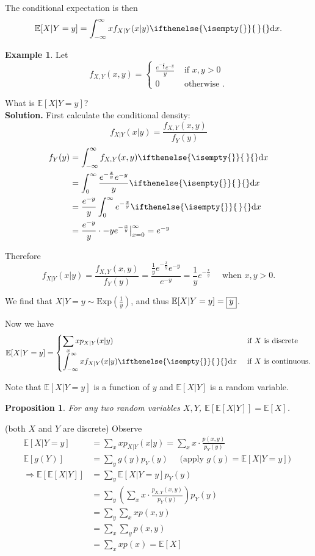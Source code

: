 \documentclass[a4paper,11pt]{amsbook}
\makeatletter
\renewenvironment{proof}[1][\proofname]{\par
    \pushQED{\qed}%
    \normalfont \topsep6\p@\@plus6\p@\relax
    \trivlist
    \itemindent\z@ %
    \item[\hskip\labelsep
          \scshape
      #1\@addpunct{.}]\ignorespaces
}{%
    \popQED\endtrivlist\@endpefalse
}
\newtheorem{proposition}{\hspace{-2em} \color{darkblue} Proposition}[chapter]
\theoremstyle{definition}
\newtheorem{example}{\hspace{-2em} \color{darkblue} Example}[chapter]
\theoremstyle{remark}
\newcommand{\E}{\mathbb{E}}
\newcommand\0{\varnothing}
\newcommand\dx[1][]{\ifthenelse{\isempty{#1}}{\,}{}\mathrm{d}x}
\newcommand\Exp{\text{Exp}}
\makeatother
\begin{document}
The conditional expectation is then $$\E[X|Y=y]=\int_{-\infty}^{\infty}xf_{X|Y}(x|y)\dx.$$

\begin{example}
    Let $$f_{X,Y}(x,y)=\begin{cases}
        \frac{e^{-\frac{x}{y}}e^{-y}}{y} & \text{ if }x,y>0 \\
        0 & \text{ otherwise }.
    \end{cases}$$

    What is $\E[X|Y=y]$?\\
    \textbf{Solution.} First calculate the conditional density:
    $$f_{X|Y}(x|y)=\frac{f_{X,Y}(x,y)}{f_Y(y)}$$
    \begin{align*}
        f_Y(y)&=\int_{-\infty}^\infty f_{X,Y}(x,y)\dx \\
        &=\int_0^\infty\frac{e^{-\frac{x}{y}}e^{-y}}{y}\dx \\
        &=\frac{e^{-y}}{y}\int_0^\infty e^{-\frac{x}{y}}\dx \\
        &=\frac{e^{-y}}{y}\cdot-ye^{-\frac{x}{y}}\big|_{x=0}^\infty=e^{-y}
    \end{align*}

    Therefore $$f_{X|Y}(x|y)=\frac{f_{X,Y}(x,y)}{f_Y(y)}=\frac{\frac{1}{y}e^{-\frac{x}{y}}e^{-y}}{e^{-y}}=\frac{1}{y}e^{-\frac{x}{y}}\quad\text{ when }x,y>0.$$

    We find that $X|Y=y\sim\Exp(\frac{1}{y})$, and thus $\E[X|Y=y]=\fbox{$y$}$.
\end{example}

Now we have $$\E[X|Y=y]=\begin{cases} 
    \displaystyle \sum_xxp_{X|Y}(x|y) & \text{ if }X\text{ is discrete} \\
    \displaystyle \int_{-\infty}^\infty xf_{X|Y}(x|y)\dx & \text{ if }X\text{ is continuous}.
\end{cases}$$

Note that $\E[X|Y=y]$ is a function of $y$ and $\E[X|Y]$ is a random variable.

\begin{proposition}
    For any two random variables $X,Y$, $\E[\E[X|Y]]=\E[X]$.
\end{proposition}
\begin{proof}
    (both $X$ and $Y$ are discrete)
    Observe \begin{align*}
        \E[X|Y=y]&=\sum_xxp_{X|Y}(x|y)=\sum_xx\cdot\frac{p(x,y)}{p_Y(y)} \\
        \E[g(Y)]&=\sum_yg(y)p_Y(y) \quad\text{ (apply $g(y)=\E[X|Y=y]$) } \\
        \Rightarrow\E[\E[X|Y]]&=\sum_y\E[X|Y=y]p_Y(y) \\
        &=\sum_y\left(\sum_xx\cdot\frac{p_{X,Y}(x,y)}{p_Y(y)}\right)p_Y(y) \\
        &=\sum_y\sum_xxp(x,y) \\
        &=\sum_x\sum_yp(x,y) \\
        &=\sum_xxp(x)=\E[X]
    \end{align*}
\end{proof}
\end{document}
